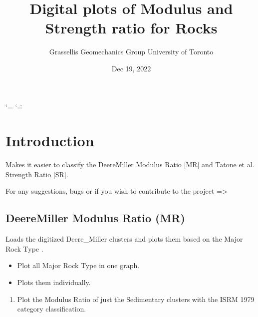\documentclass[letterpaper,10pt,english]{sphinxmanual}
\title{Digital plots of Modulus and Strength ratio for Rocks}
\date{Dec 19, 2022}
\author{Grasselli\textquotesingle{}s Geomechanics Group \sphinxhyphen{} University of Toronto}
\begin{document}
\ifdefined\shorthandoff
  \ifnum\catcode`\=\string=\active\shorthandoff{=}\fi
  \ifnum\catcode`\"=\active{}\fi
\fi

\pagestyle{empty}
\sphinxmaketitle
\pagestyle{plain}
\sphinxtableofcontents
\pagestyle{normal}
\label{\detokenize{index::doc}}


\sphinxstepscope


\chapter{Introduction}
\label{\detokenize{postprocessing_intro:introduction}}\label{\detokenize{postprocessing_intro::doc}}
\sphinxAtStartPar
Makes it easier to classify the Deere\sphinxhyphen{}Miller \sphinxhyphen{} Modulus Ratio {[}MR{]} and Tatone et al. \sphinxhyphen{} Strength Ratio {[}SR{]}.

\sphinxAtStartPar
For any suggestions, bugs or if you wish to contribute to the project =\textgreater{} 


\section{Deere\sphinxhyphen{}Miller \sphinxhyphen{} Modulus Ratio (MR)}
\label{\detokenize{postprocessing_intro:deere-miller-modulus-ratio-mr}}
\sphinxAtStartPar
{}

\sphinxAtStartPar
Loads the digitized Deere\_Miller clusters and plots them based on the Major Rock Type .
\begin{itemize}
\item {} 
\sphinxAtStartPar
Plot all Major Rock Type in one graph.

\item {} 
\sphinxAtStartPar
Plots them individually.

\end{itemize}

\sphinxAtStartPar
{}
\begin{enumerate}
%
\item {} 
\sphinxAtStartPar
Plot the Modulus Ratio of just the Sedimentary clusters with the ISRM 1979 category classification.

\end{enumerate}
\end{document}

